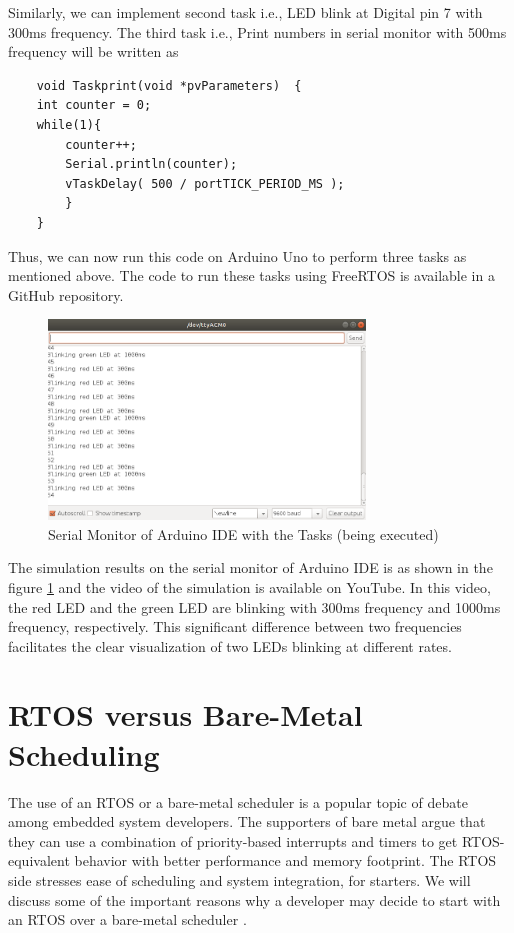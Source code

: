 \documentclass[12pt]{report}
\begin{document}
Similarly, we can implement second task i.e., LED blink at Digital pin 7 with 300ms frequency. The third task i.e., Print numbers in serial monitor with 500ms frequency will be written as
\begin{verbatim}
    void Taskprint(void *pvParameters)  {
    int counter = 0;
    while(1){
        counter++;
        Serial.println(counter);
        vTaskDelay( 500 / portTICK_PERIOD_MS ); 
    	}
    }
\end{verbatim}

Thus, we can now run this code on Arduino Uno to perform three tasks as mentioned above. The code to run these tasks using FreeRTOS is available in a GitHub repository. 

\begin{figure}[h]
\centering
\includegraphics[width=0.75\textwidth]{images/Arduino-ide-tasks.png}
\caption{Serial Monitor of Arduino IDE with the Tasks (being executed)}
\label{fig:arduino-leds-serial-mon}
\end{figure}


The simulation results on the serial monitor of Arduino IDE is as shown in the figure \ref{fig:arduino-leds-serial-mon} and the video of the simulation is available on YouTube. In this video, the red LED and the green LED are blinking with 300ms frequency and 1000ms frequency, respectively. This significant difference between two frequencies facilitates the clear visualization of two LEDs blinking at different rates.  


\section{RTOS versus Bare-Metal Scheduling}
The use of an RTOS or a bare-metal scheduler is a popular topic of debate among embedded system developers. The supporters of bare metal argue that they can use a combination of priority-based interrupts and timers to get RTOS-equivalent behavior with better performance and memory footprint. The RTOS side stresses ease of scheduling and system integration, for starters. We will discuss some of the important reasons why a developer may decide to start with an RTOS over a bare-metal scheduler \cite{rtos-need}. 
\end{document}
